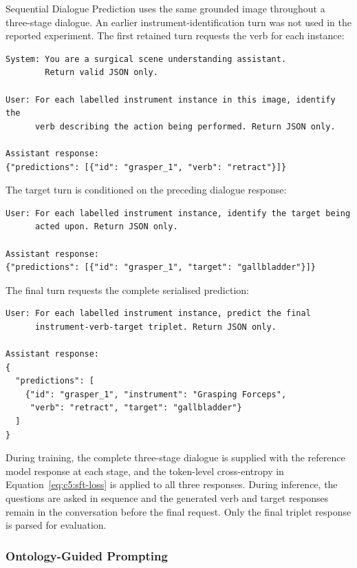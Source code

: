 Sequential Dialogue Prediction uses the same grounded image throughout a three-stage dialogue. An earlier instrument-identification turn was not used in the reported experiment. The first retained turn requests the verb for each instance:

\begin{lstlisting}[style=c5prompt]
System: You are a surgical scene understanding assistant.
        Return valid JSON only.

User: For each labelled instrument instance in this image, identify the
      verb describing the action being performed. Return JSON only.

Assistant response:
{"predictions": [{"id": "grasper_1", "verb": "retract"}]}
\end{lstlisting}

The target turn is conditioned on the preceding dialogue response:

\begin{lstlisting}[style=c5prompt]
User: For each labelled instrument instance, identify the target being
      acted upon. Return JSON only.

Assistant response:
{"predictions": [{"id": "grasper_1", "target": "gallbladder"}]}
\end{lstlisting}

The final turn requests the complete serialised prediction:

\begin{lstlisting}[style=c5prompt]
User: For each labelled instrument instance, predict the final
      instrument-verb-target triplet. Return JSON only.

Assistant response:
{
  "predictions": [
    {"id": "grasper_1", "instrument": "Grasping Forceps",
     "verb": "retract", "target": "gallbladder"}
  ]
}
\end{lstlisting}

During training, the complete three-stage dialogue is supplied with the reference model response at each stage, and the token-level cross-entropy in Equation~\ref{eq:c5:sft-loss} is applied to all three responses. During inference, the questions are asked in sequence and the generated verb and target responses remain in the conversation before the final request. Only the final triplet response is parsed for evaluation.

\subsubsection{Ontology-Guided Prompting}


